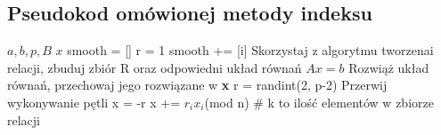 \documentclass{article}
\begin{document}
 \subsection{Pseudokod omówionej metody indeksu}
\begin{algorithm}[H]
\renewcommand{\algorithmicrequire}{\textbf{Wejście:}}
\renewcommand{\algorithmicensure}{\textbf{Wyjście:}}
\begin{algorithmic}[1]
    \REQUIRE $a, b, p, B$
    \ENSURE  $x$
    \STATE smooth = []
    \STATE r = 1
    \STATE smooth += [i]
    \ENDIF
    \ENDFOR
    \STATE Skorzystaj z algorytmu tworzenai relacji, zbuduj zbiór R oraz odpowiedni układ równań $Ax = b$
    \STATE Rozwiąż układ równań, przechowaj jego rozwiązane w \textbf{x}
        \STATE r = randint(2, p-2)
        \STATE Przerwij wykonywanie pętli
        \ENDIF
    \ENDWHILE
    \STATE x = -r
    \STATE x += $r_ix_i$(mod n) \# k to ilość elementów w zbiorze relacji
    \ENDFOR
{}
\end{algorithmic}
\end{algorithm}
\end{document}
